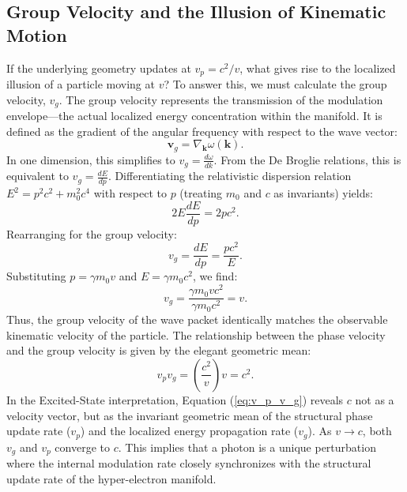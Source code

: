 \subsection{Group Velocity and the Illusion of Kinematic Motion}
If the underlying geometry updates at $v_p = c^2/v$, what gives rise to the localized illusion of a particle moving at $v$? To answer this, we must calculate the group velocity, $v_g$. The group velocity represents the transmission of the modulation envelope—the actual localized energy concentration within the manifold. It is defined as the gradient of the angular frequency with respect to the wave vector:
\begin{equation}
    \mathbf{v}_g = \nabla_{\mathbf{k}} \omega(\mathbf{k}).
\end{equation}
In one dimension, this simplifies to $v_g = \frac{d\omega}{dk}$. From the De Broglie relations, this is equivalent to $v_g = \frac{dE}{dp}$. Differentiating the relativistic dispersion relation $E^2 = p^2 c^2 + m_0^2 c^4$ with respect to $p$ (treating $m_0$ and $c$ as invariants) yields:
\begin{equation}
    2E \frac{dE}{dp} = 2p c^2.
\end{equation}
Rearranging for the group velocity:
\begin{equation}
    v_g = \frac{dE}{dp} = \frac{pc^2}{E}.
\end{equation}
Substituting $p = \gamma m_0 v$ and $E = \gamma m_0 c^2$, we find:
\begin{equation}
    v_g = \frac{\gamma m_0 v c^2}{\gamma m_0 c^2} = v.
\end{equation}
Thus, the group velocity of the wave packet identically matches the observable kinematic velocity of the particle. The relationship between the phase velocity and the group velocity is given by the elegant geometric mean:
\begin{equation}
    v_p v_g = \left( \frac{c^2}{v} \right) v = c^2. \label{eq:v_p_v_g}
\end{equation}
In the Excited-State interpretation, Equation (\ref{eq:v_p_v_g}) reveals $c$ not as a velocity vector, but as the invariant geometric mean of the structural phase update rate ($v_p$) and the localized energy propagation rate ($v_g$). As $v \rightarrow c$, both $v_g$ and $v_p$ converge to $c$. This implies that a photon is a unique perturbation where the internal modulation rate closely synchronizes with the structural update rate of the hyper-electron manifold. 

